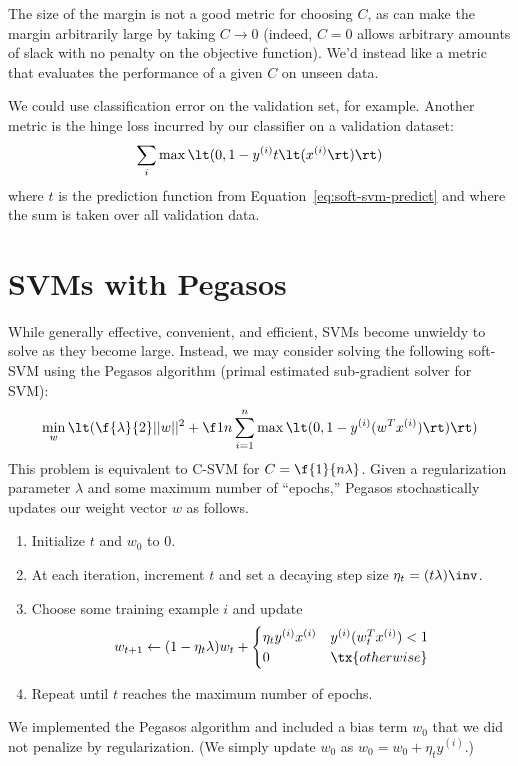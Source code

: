 \documentclass{article}
\newcommand{\sind}[1]{^{(#1)}}
\begin{document}
\begin{multicols}{2}
The size of the margin
is not a good metric for choosing $C$,
as can make the margin arbitrarily large
by taking $C \to 0$
(indeed, $C = 0$ allows arbitrary amounts of slack
with no penalty on the objective function).
We'd instead like a metric that evaluates
the performance of a given $C$
on unseen data.

We could use classification error on the validation set, for example.
Another metric is the hinge loss incurred
by our classifier on a validation dataset:
\begin{equation}
    \sum_{i} \max\lt(0, 1 - y\sind{i} t\lt(x\sind{i}\rt)\rt)
\end{equation}
where $t$ is the prediction function from Equation~\ref{eq:soft-svm-predict}
and where the sum is taken over all validation data.




\section{SVMs with Pegasos}

While generally effective, convenient, and efficient,
SVMs become unwieldy to solve as they become large.
Instead, we may consider solving the following soft-SVM
using the Pegasos algorithm
(primal estimated sub-gradient solver for SVM):
\begin{equation}
   \min_w \lt( \f{\lambda}{2}||w||^2 + \f1n\sum_{i=1}^n \max\lt(0,1-y\sind{i}(w^Tx\sind{i})\rt) \rt)
\end{equation}
This problem is equivalent to C-SVM for $C= \f{1}{n\lambda}$.
Given a regularization parameter $\lambda$
and some maximum number of ``epochs,''
Pegasos stochastically updates our weight vector $w$ as follows.
\begin{enumerate}
    \item
    Initialize $t$ and $w_0$ to 0.
    \item
    At each iteration,
    increment $t$ and set a decaying step size $\eta_t = (t\lambda)\inv$.
    \item
    Choose some training example $i$ and update
    \[
        w_{t+1} \leftarrow (1 - \eta_t\lambda) w_t +
        \begin{cases}
            \eta_t y\sind{i} x\sind{i} & y\sind{i}(w_t^T x\sind{i})<1 \\
            0 & \tx{otherwise}
        \end{cases}
    \]
    \item
    Repeat until $t$ reaches the maximum number of epochs.
\end{enumerate}
We implemented the Pegasos algorithm and included a bias term $w_0$
that we did not penalize by regularization.
(We simply update $w_0$ as $w_0 = w_0 + \eta_t y\sind{i}$.)


\end{multicols}
\end{document}
